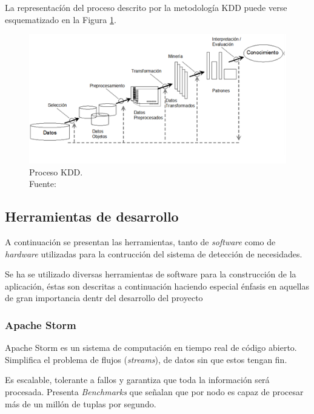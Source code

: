 La representacíón del proceso descrito por la metodología KDD puede verse esquematizado en la Figura \ref{fig:procesoKDD}.

\begin{figure}[H]
	\centering
	\captionsetup{justification=centering}
	\includegraphics[scale=1]{images/kdd.png}
	\caption[Proceso KDD.]{Proceso KDD.\\Fuente: \cite{KDDFigure}}
	\label{fig:procesoKDD}
\end{figure}

\subsection{Herramientas de desarrollo}
\label{subsec:HerrDesarrollo}

A continuación se presentan las herramientas, tanto de \textit{software} como de \textit{hardware} utilizadas para la contrucción del sistema de detección de necesidades.

Se ha se utilizado diversas herramientas de software para la construcción de la aplicación, éstas son descritas a continuación haciendo especial énfasis en aquellas de gran importancia dentr del desarrollo del proyecto

\subsubsection*{Apache Storm}
\label{subsubsec:ApacheStorm}

Apache Storm es un sistema de computación en tiempo real de código abierto. Simplifica el problema de flujos (\textit{streams}), de datos sin que estos tengan fin.

Es escalable, tolerante a fallos y garantiza que toda la información será procesada. Presenta \textit{Benchmarks} que señalan que por nodo es capaz de procesar más de un millón de tuplas por segundo.

